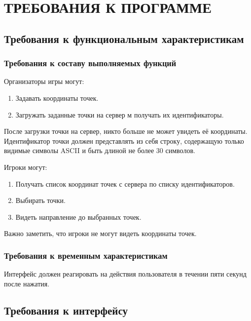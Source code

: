 \section{ТРЕБОВАНИЯ К ПРОГРАММЕ}

\subsection{Требования к функциональным характеристикам}
\label{requirements.features}

\subsubsection{Требования к составу выполняемых функций}

Организаторы игры могут:
\begin{enumerate}
	\item Задавать координаты точек. \\
	\item Загружать заданные точки на сервер м получать их идентификаторы.
\end{enumerate}

После загрузки точки на сервер, никто больше не может увидеть её координаты. Идентификатор точки должен представлять из себя строку, содержащую только видимые символы ASCII \cite{wiki:ASCII} и быть длиной не более 30 символов.

Игроки могут:
\begin{enumerate}
	\item Получать список координат точек с сервера по списку идентификаторов. \\
	\item Выбирать точки. \\
	\item Видеть направление до выбранных точек.
\end{enumerate}

Важно заметить, что игроки не могут видеть координаты точек.

\subsubsection{Требования к временным характеристикам}
Интерфейс должен реагировать на действия пользователя в течении пяти секунд после нажатия.

\subsection{Требования к интерфейсу}


